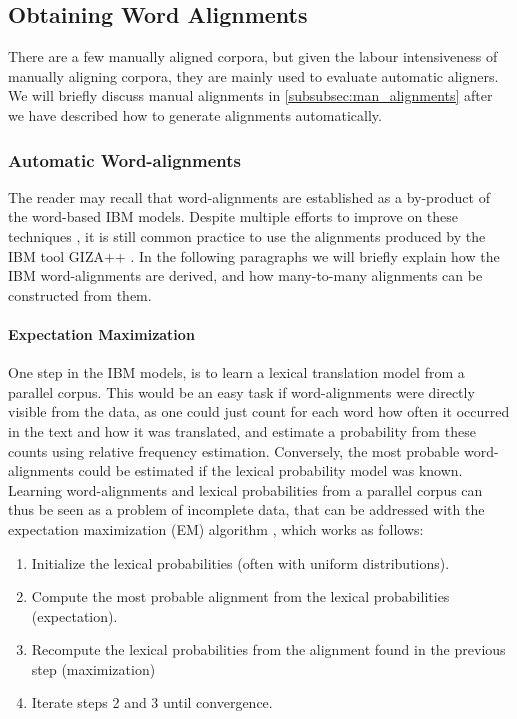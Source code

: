 \subsection{Obtaining Word Alignments}

There are a few manually aligned corpora, but given the labour intensiveness of manually aligning corpora, they are mainly used to evaluate automatic aligners. We will briefly discuss manual alignments in \ref{subsubsec:man_alignments} after we have described how to generate alignments automatically.

\subsubsection{Automatic Word-alignments}

The reader may recall that word-alignments are established as a by-product of the word-based IBM models. Despite multiple efforts to improve on these techniques \citep[see][p.119-122 for some examples]{koehn2008statistical}, it is still common practice to use the alignments produced by the IBM tool GIZA++ \citep{koehn2007moses}. In the following 
paragraphs we will briefly explain how the IBM word-alignments are derived, and how many-to-many alignments can be constructed from them.

\paragraph{Expectation Maximization}
One step in the IBM models, is to learn a lexical translation model from a parallel corpus. This would be an easy task if word-alignments were directly visible from the data, as one could just count for each word how often it occurred in the text and how it was translated, and estimate a probability from these counts using relative frequency estimation. Conversely, the most probable word-alignments could be estimated if the lexical probability model was known. Learning word-alignments and lexical probabilities from a parallel corpus can thus be seen as a problem of incomplete data, that can be addressed with the expectation maximization (EM) algorithm \citep{dempster1977maximum}, which works as follows:\begin{enumerate}
\item Initialize the lexical probabilities (often with uniform distributions).
\item Compute the most probable alignment from the lexical probabilities (expectation).
\item Recompute the lexical probabilities from the alignment found in the previous step (maximization)
\item Iterate steps 2 and 3 until convergence.
\end{enumerate}


